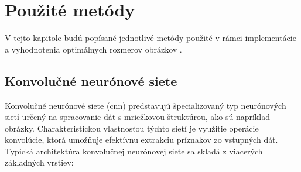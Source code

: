 \section{Použité metódy}
V tejto kapitole budú popísané jednotlivé metódy použité v rámci implementácie a 
vyhodnotenia optimálnych rozmerov obrázkov \cite{deepLearning,globalPooling,dropout,batchNormalization}.




\vspace{\baselineskip}
\subsection{Konvolučné neurónové siete}
Konvolučné neurónové siete (\acrshort{cnn}) predstavujú špecializovaný typ neurónových 
sietí určený na spracovanie dát s mriežkovou štruktúrou, ako sú napríklad obrázky. Charakteristickou vlastnosťou týchto sietí je využitie operácie konvolúcie, 
ktorá umožňuje efektívnu extrakciu príznakov zo vstupných dát.
Typická architektúra konvolučnej neurónovej siete sa skladá z viacerých základných vrstiev:

